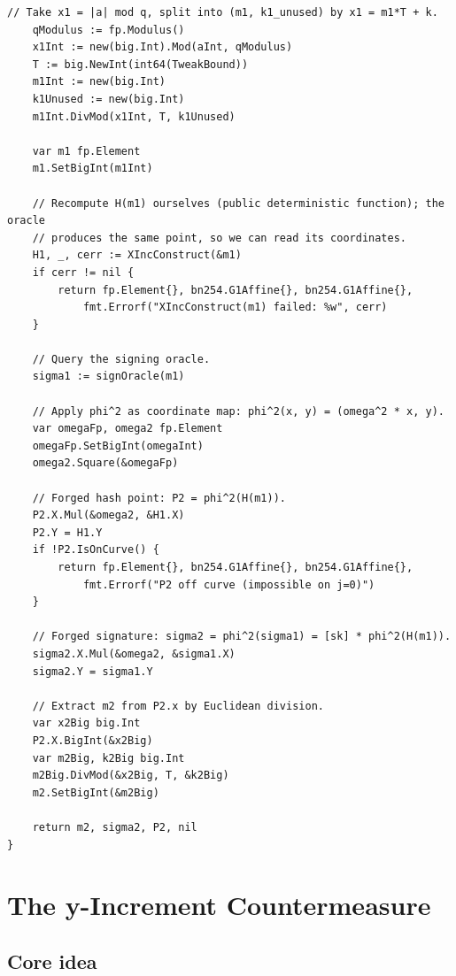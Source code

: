 \documentclass[11pt,a4paper]{article}
\theoremstyle{definition}
\begin{document}
\begin{lstlisting}[caption={BN254 algebraic attack: building the short
vector and forging a signature.}, label={lst:attack-go}]
    // Take x1 = |a| mod q, split into (m1, k1_unused) by x1 = m1*T + k.
    qModulus := fp.Modulus()
    x1Int := new(big.Int).Mod(aInt, qModulus)
    T := big.NewInt(int64(TweakBound))
    m1Int := new(big.Int)
    k1Unused := new(big.Int)
    m1Int.DivMod(x1Int, T, k1Unused)

    var m1 fp.Element
    m1.SetBigInt(m1Int)

    // Recompute H(m1) ourselves (public deterministic function); the oracle
    // produces the same point, so we can read its coordinates.
    H1, _, cerr := XIncConstruct(&m1)
    if cerr != nil {
        return fp.Element{}, bn254.G1Affine{}, bn254.G1Affine{},
            fmt.Errorf("XIncConstruct(m1) failed: %w", cerr)
    }

    // Query the signing oracle.
    sigma1 := signOracle(m1)

    // Apply phi^2 as coordinate map: phi^2(x, y) = (omega^2 * x, y).
    var omegaFp, omega2 fp.Element
    omegaFp.SetBigInt(omegaInt)
    omega2.Square(&omegaFp)

    // Forged hash point: P2 = phi^2(H(m1)).
    P2.X.Mul(&omega2, &H1.X)
    P2.Y = H1.Y
    if !P2.IsOnCurve() {
        return fp.Element{}, bn254.G1Affine{}, bn254.G1Affine{},
            fmt.Errorf("P2 off curve (impossible on j=0)")
    }

    // Forged signature: sigma2 = phi^2(sigma1) = [sk] * phi^2(H(m1)).
    sigma2.X.Mul(&omega2, &sigma1.X)
    sigma2.Y = sigma1.Y

    // Extract m2 from P2.x by Euclidean division.
    var x2Big big.Int
    P2.X.BigInt(&x2Big)
    var m2Big, k2Big big.Int
    m2Big.DivMod(&x2Big, T, &k2Big)
    m2.SetBigInt(&m2Big)

    return m2, sigma2, P2, nil
}
\end{lstlisting}

\section{The y-Increment Countermeasure}
\label{sec:yinc}

\subsection{Core idea}
\end{document}
